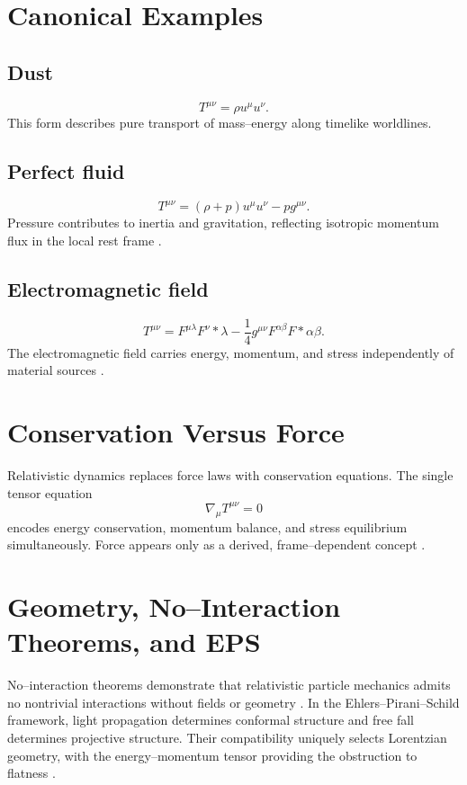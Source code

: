 \documentclass[11pt,a4paper]{article}
\begin{document}
\section{Canonical Examples}
\subsection{Dust}
\begin{equation}
T^{\mu\nu} = \rho u^\mu u^\nu.
\end{equation}
This form describes pure transport of mass--energy along timelike worldlines.

\subsection{Perfect fluid}
\begin{equation}
T^{\mu\nu} = (\rho + p)u^\mu u^\nu - p g^{\mu\nu}.
\end{equation}
Pressure contributes to inertia and gravitation, reflecting isotropic momentum flux in the local rest frame \cite{MisnerThorneWheeler}.

\subsection{Electromagnetic field}
\begin{equation}
T^{\mu\nu} = F^{\mu\lambda}F^{\nu}{}*{\lambda} - \frac{1}{4} g^{\mu\nu}F^{\alpha\beta}F*{\alpha\beta}.
\end{equation}
The electromagnetic field carries energy, momentum, and stress independently of material sources \cite{Jackson1999}.

\section{Conservation Versus Force}
Relativistic dynamics replaces force laws with conservation equations. The single tensor equation
\begin{equation}
\nabla_\mu T^{\mu\nu} = 0
\end{equation}
encodes energy conservation, momentum balance, and stress equilibrium simultaneously. Force appears only as a derived, frame--dependent concept \cite{Synge1960}.

\section{Geometry, No--Interaction Theorems, and EPS}
No--interaction theorems demonstrate that relativistic particle mechanics admits no nontrivial interactions without fields or geometry \cite{Currie1963}. In the Ehlers--Pirani--Schild framework, light propagation determines conformal structure and free fall determines projective structure. Their compatibility uniquely selects Lorentzian geometry, with the energy--momentum tensor providing the obstruction to flatness \cite{Ehlers1972}.
\end{document}
